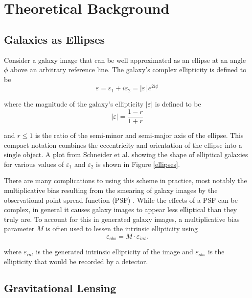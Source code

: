 \documentclass[%
 reprint,
 amsmath,amssymb,
 aps,nofootinbib
]{revtex4-1}
\begin{document}
\section{Theoretical Background}

\subsection*{Galaxies as Ellipses}
Consider a galaxy image that can be well approximated as an ellipse at an angle $\phi$ above an arbitrary reference line. The galaxy's complex ellipticity is defined to be 
\begin{equation}\label{complex_ellipticity}
\varepsilon=\varepsilon_1+i\varepsilon_2=|\varepsilon|\,e^{2i\phi}
\end{equation}

\noindent where the magnitude of the galaxy's ellipticity $|\varepsilon|$ is defined to be
\begin{equation}
|\varepsilon|=\frac{1-r}{1+r}
\end{equation}

\noindent and $r\leq1$ is the ratio of the semi-minor and semi-major axis of the ellipse. This compact notation combines the eccentricity and orientation of the ellipse into a single object. A plot from Schneider et al. \cite{schneider} showing the shape of elliptical galaxies for various values of $\varepsilon_1$ and $\varepsilon_2$ is shown in Figure \ref{ellipses}.

There are many complications to using this scheme in practice, most notably the multiplicative bias resulting from the smearing of galaxy images by the observational point spread function (PSF) \cite{multiplicative_bias}. While the effects of a PSF can be complex, in general it causes galaxy images to appear less elliptical than they truly are. To account for this in generated galaxy images, a multiplicative bias parameter $M$ is often used to lessen the intrinsic ellipticity using
$$\varepsilon_{obs}=M\cdot\varepsilon_{int}.$$

\noindent where $\varepsilon_{int}$ is the generated intrinsic ellipticity of the image and $\varepsilon_{obs}$ is the ellipticity that would be recorded by a detector.

\subsection*{Gravitational Lensing}
\end{document}
